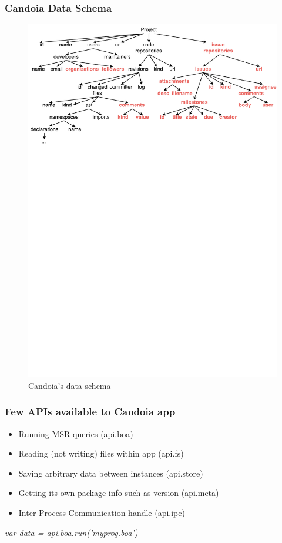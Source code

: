 \appendix
        \begin{frame}
        \frametitle{Candoia Data Schema}
                \begin{figure}
                    \centering
                    \includegraphics[scale=0.45]{figures/data-schema.pdf}
                    \caption{Candoia's data schema}
                \end{figure}
        \end{frame}

        \begin{frame}
            \frametitle{Few APIs available to Candoia app}
            \begin{itemize}
                \item Running MSR queries (api.boa)
                \item Reading (not writing) files within app (api.fs)
                \item Saving arbitrary data between instances (api.store)
                \item Getting its own package info such as version (api.meta)
                \item Inter-Process-Communication handle (api.ipc)
            \end{itemize}
            \centering
                \emph{var data = api.boa.run('myprog.boa')}
         \end{frame}

